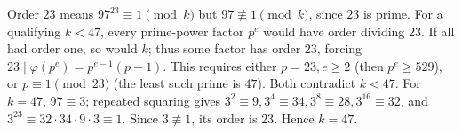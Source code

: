 Order $23$ means $97^{23}\equiv1\pmod k$ but $97\not\equiv1\pmod k$, since $23$ is prime. For a qualifying $k<47$, every prime-power factor $p^e$ would have order dividing $23$. If all had order one, so would $k$; thus some factor has order $23$, forcing $23\mid\varphi(p^e)=p^{e-1}(p-1)$. This requires either $p=23,e\ge2$ (then $p^e\ge529$), or $p\equiv1\pmod{23}$ (the least such prime is $47$). Both contradict $k<47$. For $k=47$, $97\equiv3$; repeated squaring gives $3^2\equiv9,3^4\equiv34,3^8\equiv28,3^{16}\equiv32$, and $3^{23}\equiv32\cdot34\cdot9\cdot3\equiv1$. Since $3\not\equiv1$, its order is $23$. Hence $\boxed{k=47}$.
